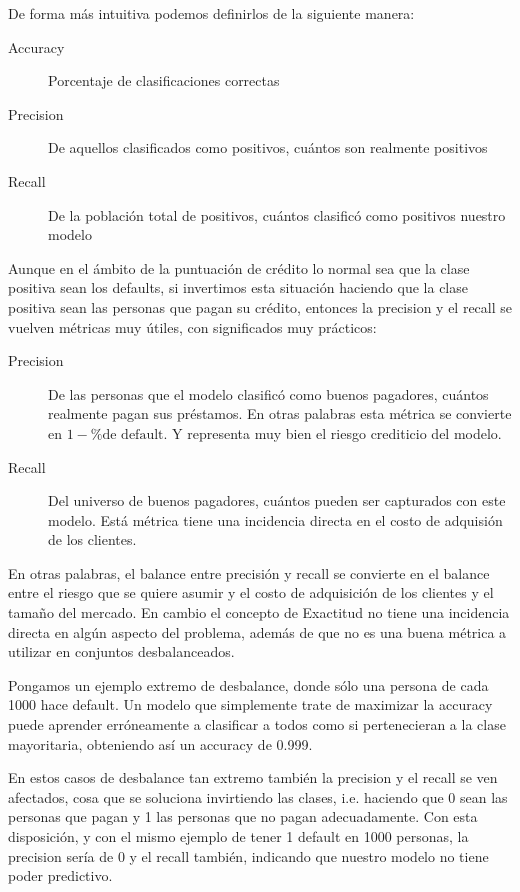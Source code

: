 De forma más intuitiva podemos definirlos de la siguiente manera:

\begin{description}
    \item [Accuracy] Porcentaje de clasificaciones correctas
    \item [Precision] De aquellos clasificados como positivos, cuántos son realmente positivos
    \item [Recall] De la población total de positivos, cuántos clasificó como positivos nuestro modelo
\end{description}

Aunque en el ámbito de la puntuación de crédito lo normal sea que la clase positiva sean los defaults, si invertimos esta situación haciendo que la clase positiva sean las personas que pagan su crédito, entonces la precision y el recall se vuelven métricas muy útiles, con significados muy prácticos:

\begin{description}
    \item [Precision] De las personas que el modelo clasificó como buenos pagadores, cuántos realmente pagan sus préstamos. En otras palabras esta métrica se convierte en $1 - \text{\% de default}$. Y representa muy bien el riesgo crediticio del modelo.
    \item [Recall] Del universo de buenos pagadores, cuántos pueden ser capturados con este modelo. Está métrica tiene una incidencia directa en el costo de adquisión de los clientes.
\end{description}

En otras palabras, el balance entre precisión y recall se convierte en el balance entre el riesgo que se quiere asumir y el costo de adquisición de los clientes y el tamaño del mercado. En cambio el concepto de Exactitud no tiene una incidencia directa en algún aspecto del problema, además de que no es una buena métrica a utilizar en conjuntos desbalanceados.

Pongamos un ejemplo extremo de desbalance, donde sólo una persona de cada 1000 hace default. Un modelo que simplemente trate de maximizar la accuracy puede aprender erróneamente a clasificar a todos como si pertenecieran a la clase mayoritaria, obteniendo así un accuracy de 0.999.

En estos casos de desbalance tan extremo también la precision y el recall se ven afectados, cosa que se soluciona invirtiendo las clases, i.e. haciendo que 0 sean las personas que pagan y 1 las personas que no pagan adecuadamente. Con esta disposición, y con el mismo ejemplo de tener 1 default en 1000 personas, la precision sería de 0 y el recall también, indicando que nuestro modelo no tiene poder predictivo.

